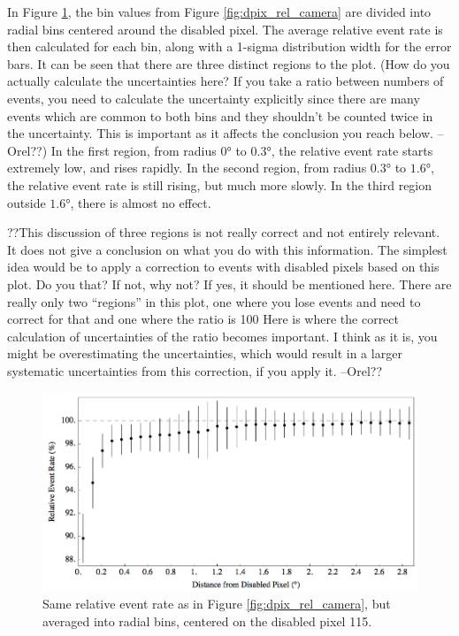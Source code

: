     In Figure \ref{fig:dpix_rel_radial}, the bin values from Figure \ref{fig:dpix_rel_camera} are divided into radial bins centered around the disabled pixel.
    The average relative event rate is then calculated for each bin, along with a 1-sigma distribution width for the error bars.
    It can be seen that there are three distinct regions to the plot.
    (How do you actually calculate the uncertainties here? If you take a ratio between numbers of events, you need to calculate the uncertainty explicitly since there are many events which are common to both bins and they shouldn’t be counted twice in the uncertainty.  This is important as it affects the conclusion you reach below. --Orel??)
    In the first region, from radius $\ang{0}$ to $\ang{0.3}$, the relative event rate starts extremely low, and rises rapidly.
    In the second region, from radius $\ang{0.3}$ to $\ang{1.6}$, the relative event rate is still rising, but much more slowly.
    In the third region outside $\ang{1.6}$, there is almost no effect.

    ??This discussion of three regions is not really correct and not entirely relevant.
    It does not give a conclusion on what you do with this information.
    The simplest idea would be to apply a correction to events with disabled pixels based on this plot. Do you that? If not, why not? If yes, it should be mentioned here.
    There are really only two “regions” in this plot, one where you lose events and need to correct for that and one where the ratio is 100%
    Here is where the correct calculation of uncertainties of the ratio becomes important.
    I think as it is, you might be overestimating the uncertainties, which would result in a larger systematic uncertainties from this correction, if you apply it. --Orel??


    \begin{figure}[ht]
      \centering
      \includegraphics[width=\textwidth]{images/disabled_pixel/relativerate_radial}
      \caption[Radial Relative Event Rate]{
        Same relative event rate as in Figure \ref{fig:dpix_rel_camera}, but averaged into radial bins, centered on the disabled pixel 115.
      }
      \label{fig:dpix_rel_radial}
    \end{figure}

